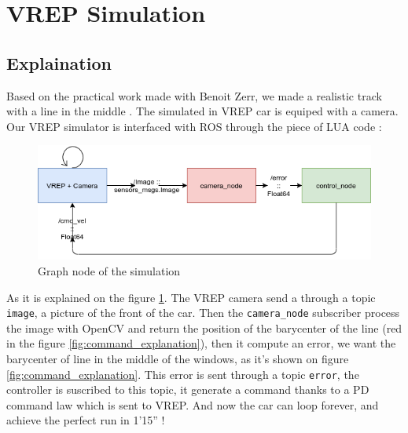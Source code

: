 \section{VREP Simulation}

\subsection{Explaination}

Based on the practical work made with Benoit Zerr, we made a realistic track with a line in the middle \cite{zerr}.
The simulated in VREP car is equiped with a camera. Our VREP simulator is interfaced with ROS through the piece of LUA code :

\begin{figure}[ht!]
    \begin{center}
        \includegraphics[scale=0.5]{Images/graph_node_simulation.png}
    \end{center}
    \caption{Graph node of the simulation}
    \label{fig:graph_node_simulation}

\end{figure}

As it is explained on the figure \ref{fig:graph_node_simulation}. The VREP camera send a through a topic \texttt{image}, a picture of the front of the car. 
Then the \texttt{camera\_node} subscriber process the image with OpenCV and return the position
of the barycenter of the line (red in the figure \ref{fig:command_explanation}), then it compute an error, we want the barycenter of line in the middle of the windows, as it's shown on figure \ref{fig:command_explanation}. 
This error is sent through a topic \texttt{error}, the controller is suscribed to this topic,
it generate a command thanks to a PD command law which is sent to VREP. And now the car can loop forever, and achieve 
the perfect run in 1'15'' !


